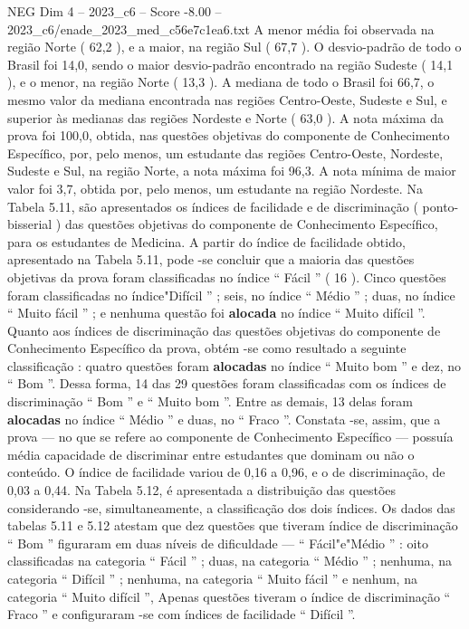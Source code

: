 \begin{textsample}{NEG Dim 4 – 2023\_c6 – Score -8.00 – 2023\_c6/enade\_2023\_med\_c56e7c1ea6.txt}
A menor média foi observada na região Norte ( 62,2 ), e a maior, na região Sul ( 67,7 ).
O desvio-padrão de todo o Brasil foi 14,0, sendo o maior desvio-padrão encontrado na região Sudeste ( 14,1 ), e o menor, na região Norte ( 13,3 ).
A mediana de todo o Brasil foi 66,7, o mesmo valor da mediana encontrada nas regiões Centro-Oeste, Sudeste e Sul, e superior às medianas das regiões Nordeste e Norte ( 63,0 ).
A nota máxima da prova foi 100,0, obtida, nas questões objetivas do componente de Conhecimento Específico, por, pelo menos, um estudante das regiões Centro-Oeste, Nordeste, Sudeste e Sul, na região Norte, a nota máxima foi 96,3.
A nota mínima de maior valor foi 3,7, obtida por, pelo menos, um estudante na região Nordeste.
Na Tabela 5.11, são apresentados os índices de facilidade e de discriminação ( ponto-bisserial ) das questões objetivas do componente de Conhecimento Específico, para os estudantes de Medicina.
A partir do índice de facilidade obtido, apresentado na Tabela 5.11, pode -se concluir que a maioria das questões objetivas da prova foram classificadas no índice “ Fácil ” ( 16 ).
Cinco questões foram classificadas no índice"Difícil ” ; seis, no índice “ Médio ” ; duas, no índice “ Muito fácil ” ; e nenhuma questão foi \textbf{alocada} no índice “ Muito difícil ”.
Quanto aos índices de discriminação das questões objetivas do componente de Conhecimento Específico da prova, obtém -se como resultado a seguinte classificação : quatro questões foram \textbf{alocadas} no índice “ Muito bom ” e dez, no “ Bom ”.
Dessa forma, 14 das 29 questões foram classificadas com os índices de discriminação “ Bom ” e “ Muito bom ”.
Entre as demais, 13 delas foram \textbf{alocadas} no índice “ Médio ” e duas, no “ Fraco ”.
Constata -se, assim, que a prova — no que se refere ao componente de Conhecimento Específico — possuía média capacidade de discriminar entre estudantes que dominam ou não o conteúdo.
O índice de facilidade variou de 0,16 a 0,96, e o de discriminação, de 0,03 a 0,44.
Na Tabela 5.12, é apresentada a distribuição das questões considerando -se, simultaneamente, a classificação dos dois índices.
Os dados das tabelas 5.11 e 5.12 atestam que dez questões que tiveram índice de discriminação “ Bom ” figuraram em duas níveis de dificuldade — “ Fácil"e"Médio ” : oito classificadas na categoria “ Fácil ” ; duas, na categoria “ Médio ” ; nenhuma, na categoria “ Difícil ” ; nenhuma, na categoria “ Muito fácil ” e nenhum, na categoria “ Muito difícil ”, Apenas questões tiveram o índice de discriminação “ Fraco ” e configuraram -se com índices de facilidade “ Difícil ”.

\end{textsample}
